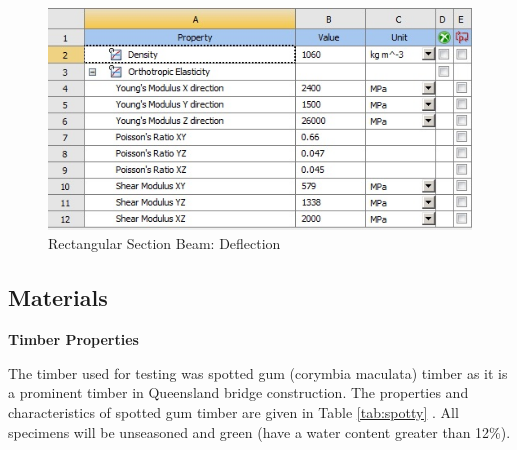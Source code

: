 \documentclass[11pt,a4paper]{article}
\numberwithin{equation}{subsection}
\begin{document}
	\begin{figure}[h]
		\begin{center}
		\includegraphics[scale=0.8]{Ansys_Properties}
	\end{center}
		\caption{Rectangular Section Beam: Deflection}
		\label{fig:Properties}
	\end{figure}
\pagebreak


\subsection{Materials}
\noindent \textbf{Timber Properties}\par
\noindent
The timber used for testing was spotted gum (corymbia maculata) timber as it is a prominent timber in Queensland bridge construction. The properties and characteristics of spotted gum timber are given in Table \ref{tab:spotty} \cite{elsener_material_2014,hopewell_spotted_2004}. All specimens will be unseasoned and green (have a water content greater than 12\%).

\vspace*{\baselineskip}

\label{tab:spotty}
\end{document}

